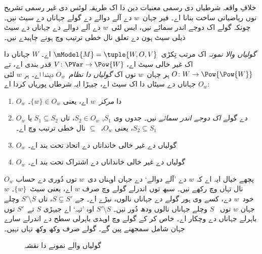 \documentclass[../../../include/open-logic-section]{subfiles}
\begin{document}


خلافِ واقعہ شرطیاں دی رسمی معنیات دین دا اک طریقہ لوئس دی غیر رسمی
تشریح نوں ریاضیاتی ساخت بنانا اے۔ فیر جہان~$w$ دے آلے دوالے دے گولے
جہاناں دے سیٹ نیں۔ چونکہ گولے اک دوجے اندر سمائے نیں، ایس لئی~$w$
دے آلے دوالے دے جہاناں دے سیٹ ذیلی سیٹ ہون دے تعلق نال خطی ترتیب وچ
ہونے چاہیدے نیں۔

\begin{defn}
  \emph{گولیاں والا نمونہ} اک مرتب تِکڑی~$\mModel{M} = \tuple{W, O, V}$ اے۔
  $W$ جہاناں دا اک غیر خالی سیٹ اے، $V\colon \PVar \to \Pow{W}$ قدر بندی
  اے، تے $O\colon W \to \Pow{\Pow{W}}$ ہر جہان~$w$ نوں اک
  \emph{گولیاں دا نظام}~$O_w$ دیندا اے۔ ہر $w$ لئی $O_w$ جہاناں دے سیٹاں دا
  اک سیٹ اے، جیہڑا ایہ شرطاں پوریاں کردا اے:
  \begin{enumerate}
  \item $O_w$ دا \emph{مرکز}~$w$ اے، یعنی $\{w\} \in O_w$۔
  \item $O_w$ دے گولے \emph{اک دوجے اندر سمائے} نیں۔ جدوں وی
    $S_1$, $S_2 \in O_w$، تاں $S_1 \subseteq S_2$ یا $S_2 \subseteq S_1$،
    یعنی $O_w$،~$\subseteq$ نال خطی ترتیب وچ اے۔
  \item $O_w$ گولیاں دے غیر خالی خانداناں دے اتحاد تحت بند اے۔
  \item $O_w$ گولیاں دے غیر خالی خانداناں دے اشتراک تحت بند اے۔
  \end{enumerate}
\end{defn}

$O_w$ پچھے خیال ایہ اے کہ $w$ دے ’آلے دوالے‘ دے جہان اوہناں دی~$w$
توں دُوری دے حساب نال تہاں وچ رکھے نیں۔ سبھ توں اندرلے گولے وچ صرف $w$
اے، یعنی سیٹ~$\{w\}$۔ $w$ خود~$w$ دے، کسے وی ہور گولے دے جہاناں نالوں،
نیڑے اے۔ جے $S \subsetneq S'$، تاں $S' \setminus S$ وچلے جہان $w$ توں
~$S$ وچلے جہاناں نالوں ودھ دُور نیں۔ $S' \setminus S$ اوہ ’تہہ‘ اے جیہڑی
$S$ تے~$S'$ توں باہرلے جہاناں دے وچکار اے۔ خاص کر کے گولے وچ اوہدی باہرلی
سطح دے اندرلے سارے جہان شامل سمجھنے پین گے۔ گولے صرف وکھ وکھ تہاں نہیں۔

\begin{figure}
\begin{center}
\caption{گولیاں والے نمونے دا نقشہ}
\end{center}
\end{figure}
\end{document}

